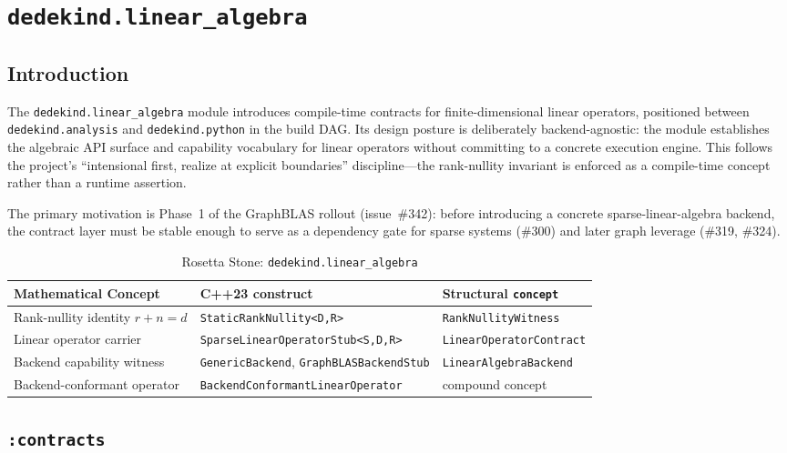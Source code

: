 \documentclass[11pt, a4paper]{report}
\begin{document}
\chapter{\texttt{dedekind.linear\_algebra}}
\label{chap:linear_algebra}

\section{Introduction}

The \texttt{dedekind.linear\_algebra} module introduces compile-time contracts for finite-dimensional linear operators, positioned between \texttt{dedekind.analysis} and \texttt{dedekind.python} in the build DAG.
Its design posture is deliberately backend-agnostic: the module establishes the algebraic API surface and capability vocabulary for linear operators without committing to a concrete execution engine.
This follows the project's ``intensional first, realize at explicit boundaries'' discipline---the rank-nullity invariant is enforced as a compile-time concept rather than a runtime assertion.

The primary motivation is Phase~1 of the GraphBLAS rollout (issue~\#342): before introducing a concrete sparse-linear-algebra backend, the contract layer must be stable enough to serve as a dependency gate for sparse systems (\#300) and later graph leverage (\#319, \#324).

\begin{table}[ht]
\centering
\caption{Rosetta Stone: \texttt{dedekind.linear\_algebra}}
\label{table:linear_algebra}
\begin{tabular}{lll}
\toprule
\textbf{Mathematical Concept} & \textbf{C++23 construct} & \textbf{Structural \texttt{concept}} \\
\midrule
Rank-nullity identity $r + n = d$ & \texttt{StaticRankNullity<D,R>} & \texttt{RankNullityWitness} \\
Linear operator carrier & \texttt{SparseLinearOperatorStub<S,D,R>} & \texttt{LinearOperatorContract} \\
Backend capability witness & \texttt{GenericBackend}, \texttt{GraphBLASBackendStub} & \texttt{LinearAlgebraBackend} \\
Backend-conformant operator & \texttt{BackendConformantLinearOperator} & compound concept \\
\bottomrule
\end{tabular}
\end{table}

\section{\texttt{:contracts}}
\label{sec:linear_algebra-contracts}
\end{document}
